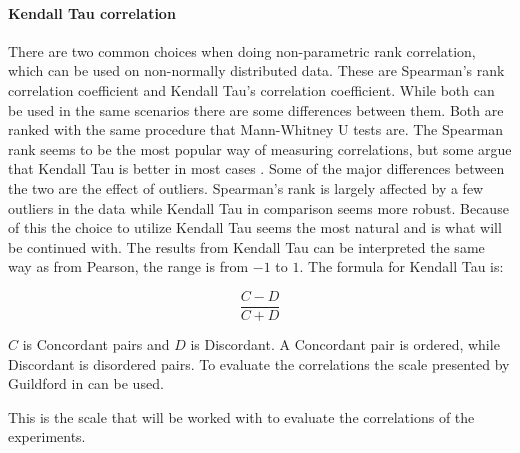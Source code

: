 \paragraph{Kendall Tau correlation}
There are two common choices when doing non-parametric rank correlation, which can be used on non-normally distributed data. These are Spearman's rank correlation coefficient and Kendall Tau's correlation coefficient\cite*[]{han1987non}. While both can be used in the same scenarios there are some differences between them. Both are ranked with the same procedure that Mann-Whitney U tests are. The Spearman rank seems to be the most popular way of measuring correlations, but some argue that Kendall Tau is better in most cases \cite{gilpin1993table}. Some of the major differences between the two are the effect of outliers. Spearman's rank is largely affected by a few outliers in the data while Kendall Tau in comparison seems more robust. Because of this the choice to utilize Kendall Tau seems the most natural and is what will be continued with. The results from Kendall Tau can be interpreted the same way as from Pearson, the range is from $-1$ to $1$. The formula for Kendall Tau is:

\begin{equation}
    \frac{C-D}{C+D}
\end{equation}

$C$ is Concordant pairs and $D$ is Discordant. A Concordant pair is ordered, while Discordant is disordered pairs\cite{kendall1938new}. To evaluate the correlations the scale presented by Guildford in \cite[219]{guilford1950fundamental} can be used.



This is the scale that will be worked with to evaluate the correlations of the experiments.

